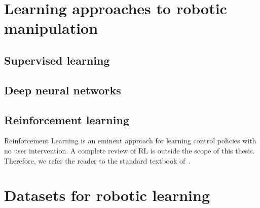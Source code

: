 \documentclass[\home/main.tex]{subfiles}
\begin{document}

\section{Learning approaches to robotic manipulation} \label{sec:lit_learning}

\subsection{Supervised learning} \label{subsec:lit_sl}
\subsection{Deep neural networks} \label{subsec:lit_dnn}
\subsection{Reinforcement learning} \label{subsec:lit_rl}

Reinforcement Learning is an eminent approach for learning control policies with no user intervention. A complete review of RL is outside the scope of this thesis. Therefore, we refer the reader to the standard textbook of~\citeauthor{SuttonAndBarto}.

\section{Datasets for robotic learning} \label{sec:lit_datasets}
\end{document}

